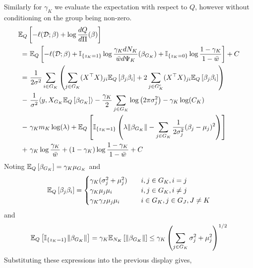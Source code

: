 \documentclass[12pt]{article}
\begin{document}
Similarly for $\gamma_K$ we evaluate the expectation with respect to $Q$, however without conditioning on the group being non-zero.
{\allowdisplaybreaks
\begin{align}
    \mathbb{E}_{Q} & \left[ 
	- \ell(\mathcal{D}; \beta) + \log \frac{dQ}{d\Pi}(\beta) 
    \right]  \nonumber \\
= &\
    \mathbb{E}_{Q} \left[ 
	- \ell(\mathcal{D}; \beta) 
	+ \mathbb{I}_{\{z_K = 1\}} \log \frac{\gamma_K dN_K}{\bar{w} d\Psi_K}(\beta_{G_K}) 
	+ \mathbb{I}_{\{z_K = 0\}} \log \frac{1 - \gamma_K}{1 - \bar{w}}
    \right] + C \nonumber \\
=&\
    \frac{1}{2\sigma^2} 
    \sum_{i \in G_K} \left( 
	\sum_{j \in G_K} (X^\top X)_{ji} 
	    \mathbb{E}_{Q} \left[ \beta_j \beta_i \right] 
	+ 
	2 \sum_{j \in G_K^c} (X^\top X)_{ji} 
	    \mathbb{E}_{Q} \left[ \beta_j \beta_i \right] 
    \right ) \nonumber \\
- &\
    \frac{1}{\sigma^2} \langle y, X_{G_K} \mathbb{E}_Q\left[\beta_{G_K} \right] \rangle 
-
    \frac{\gamma_K}{2} \sum_{j \in G_K} \log \left( 2 \pi \sigma_j^2 \right)
-
    \gamma_K \log(C_K )
    \nonumber \\
- &\
    \gamma_K m_K \log (\lambda) 
+ 
    \mathbb{E}_{Q} \left[ 
	\mathbb{I}_{\{z_K=1\}} \left(
	\lambda \| \beta_{G_K} \|
	- \sum_{j \in G_K}
	    \frac{1}{2\sigma_j^2} (\beta_{j} - \mu_j)^2
	\right)
    \right]  \nonumber \\ 
+ &\
    \gamma_K \log \frac{\gamma_K}{\bar{w}}
    + (1 - \gamma_K) \log \frac{1 - \gamma_K}{1 - \bar{w}}
+ C \nonumber
\end{align}
}
Noting $\mathbb{E}_Q \left[ \beta_{G_K} \right] = \gamma_K \mu_{G_K} $ and
\begin{equation}
    \mathbb{E}_{Q} \left[ \beta_j \beta_i \right] = \begin{cases}
	\gamma_K (\sigma_{j}^2 + \mu_{j}^2) 	& \quad i,j \in G_K, i=j \\
	\gamma_K \mu_{j}\mu_{i} 		& \quad i,j \in G_K, i \neq j \\
	\gamma_K \gamma_J \mu_{j}\mu_{i} 	& \quad i \in G_K, j \in G_J, J \neq K
    \end{cases}
\end{equation}
and
\begin{equation}
    \mathbb{E}_Q \left[ \mathbb{I}_{\{z_K = 1\}} \| \beta_{G_K} \| \right] = 
    \gamma_K \mathbb{E}_{N_K} \left[ \| \beta_{G_K} \| \right]
    \leq \gamma_K \left( \sum_{j \in G_K} \sigma^2_j + \mu^2_j \right)^{1/2}
\end{equation}
Substituting these expressions into the previous display gives,
\end{document}
